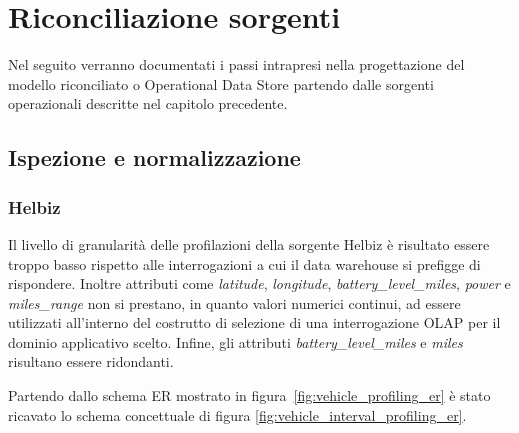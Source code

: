 \chapter{Riconciliazione sorgenti}

Nel seguito verranno documentati i passi intrapresi nella progettazione
del modello riconciliato o Operational Data Store partendo dalle sorgenti
operazionali descritte nel capitolo precedente.

\section{Ispezione e normalizzazione}

\subsection{Helbiz}

Il livello di granularità delle profilazioni della sorgente Helbiz è
risultato essere troppo basso rispetto alle interrogazioni a cui il data
warehouse si prefigge di rispondere. Inoltre attributi come
\textit{latitude}, \textit{longitude}, \textit{battery\_level\_miles},
\textit{power} e \textit{miles\_range} non si prestano, in quanto valori
numerici continui, ad essere utilizzati all'interno del costrutto di
selezione di una interrogazione OLAP per il dominio applicativo
scelto. Infine, gli attributi \textit{battery\_level\_miles} e
\textit{miles} risultano essere ridondanti.

Partendo dallo schema ER mostrato in figura~\ref{fig:vehicle_profiling_er} è
stato ricavato lo schema concettuale di figura
\ref{fig:vehicle_interval_profiling_er}.

